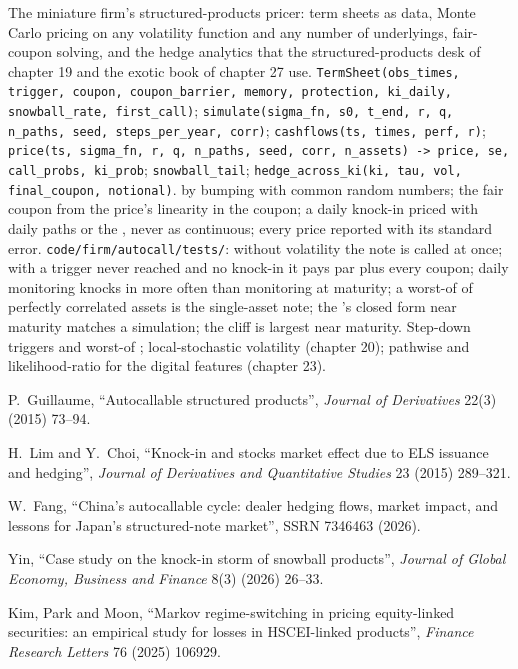 \begin{build}
 The miniature firm's structured-products pricer: term sheets as data, Monte Carlo pricing on any volatility function
and any number of underlyings, fair-coupon solving, and the hedge analytics that the structured-products desk of chapter 19 and the
exotic book of chapter 27 use.
 \texttt{TermSheet(obs\_times, trigger, coupon, coupon\_barrier, memory, protection, ki\_daily, snowball\_rate,
first\_call)}; \texttt{simulate(sigma\_fn, s0, t\_end, r, q, n\_paths, seed, steps\_per\_year, corr)}; \texttt{cashflows(ts, times,
perf, r)}; \texttt{price(ts, sigma\_fn, r, q, n\_paths, seed, corr, n\_assets) -> price, se, call\_probs, ki\_prob}; \texttt{snowball\_tail};
\texttt{hedge\_across\_ki(ki, tau, vol, final\_coupon, notional)}.
  by bumping with common random numbers; the fair coupon from the price's linearity in the coupon; a daily knock-in
priced with daily paths or the , never as continuous; every price reported with its standard error.
 \texttt{code/firm/autocall/tests/}: without volatility the note is called at once; with a trigger never reached
and no knock-in it pays par plus every coupon; daily monitoring knocks in more often than monitoring at maturity; a worst-of of perfectly
correlated assets is the single-asset note; the 's closed form near maturity matches a simulation; the cliff is largest near
maturity.
 Step-down triggers and worst-of ; local-stochastic volatility (chapter 20); pathwise and likelihood-ratio
 for the digital features (chapter 23).
\end{build}

\begin{omsources}
\item P.~Guillaume, ``Autocallable structured products'', \emph{Journal of Derivatives} 22(3) (2015) 73--94.
\item H.~Lim and Y.~Choi, ``Knock-in and stocks market effect due to ELS issuance and hedging'', \emph{Journal of Derivatives and
Quantitative Studies} 23 (2015) 289--321.
\item W.~Fang, ``China's autocallable cycle: dealer hedging flows, market impact, and lessons for Japan's structured-note market'',
SSRN 7346463 (2026).
\item Yin, ``Case study on the knock-in storm of snowball products'', \emph{Journal of Global Economy, Business and Finance} 8(3) (2026)
26--33.
\item Kim, Park and Moon, ``Markov regime-switching in pricing equity-linked securities: an empirical study for losses in HSCEI-linked
products'', \emph{Finance Research Letters} 76 (2025) 106929.
\end{omsources}

